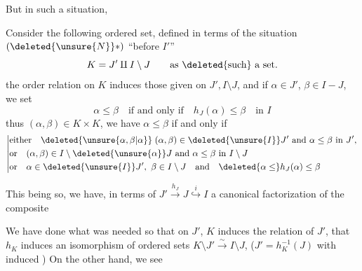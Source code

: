 
 But in such a situation,

Consider the following ordered set, defined in terms of the situation $(\deleted{\unsure{N}}*)$ ``before $I'$''
\[
 K=J'\mathbin{\amalg} I\setminus J\qquad\text{as \deleted{such} a set.}
\]
the order relation on $K$ induces those given on $J',I\setminus J$, and if $\alpha\in J'$, $\beta\in I-J$, we set
\[
 \alpha\leq\beta\quad\text{if and only if}\quad h_J(\alpha)\leq\beta\quad\text{in }I
\]
thus $(\alpha,\beta)\in K\times K$, we have $\alpha\leq\beta$ if and only if
\[
\left|\begin{aligned}
 &\text{either}\quad \deleted{\unsure{\alpha,\beta|\alpha}}\;(\alpha,\beta)\in\deleted{\unsure{I}}J' \ \text{and}\ \alpha\leq\beta\ \text{in }J',\\
 &\text{or}\quad (\alpha,\beta)\in I\setminus\deleted{\unsure{\alpha}}J\ \text{and}\ \alpha\leq\beta\ \text{in }I\setminus J\\
 &\text{or}\quad \alpha\in\deleted{\unsure{I}}J',\ \beta\in I\setminus J\quad\text{and}\quad \deleted{\alpha\leq}h_J(\alpha)\leq\beta
\end{aligned}\right.
\]

This being so, we have, in terms of $J'\xrightarrow{h_J}J\overset{i}{\hookrightarrow}I$ a canonical factorization of the composite

We have done what was needed so that on $J'$, $K$ induces the relation of $J'$, that $h_K$ induces an isomorphism of ordered sets $K\setminus J'\xrightarrow{\sim}I\setminus J$,     ($J'=h_K^{-1}(J)$ with induced ) On the other hand, we see
